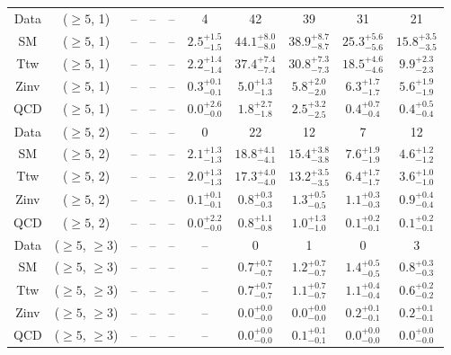 \begin{table}[h!]
{\begin{tabular}{cccccccccc}
	Data & ($\ge5$, 1) & -- & -- & -- & 4 & 42 & 39 & 31 & 21 \\[0.5ex] 
	SM & ($\ge5$, 1) & -- & -- & -- & $2.5^{+ 1.5 }_{- 1.5 }$ & $44.1^{+ 8.0 }_{- 8.0 }$ & $38.9^{+ 8.7 }_{- 8.7 }$ & $25.3^{+ 5.6 }_{- 5.6 }$ & $15.8^{+ 3.5 }_{- 3.5 }$ \\[0.5ex] 
	Ttw & ($\ge5$, 1) & -- & -- & -- & $2.2^{+ 1.4 }_{- 1.4 }$ & $37.4^{+ 7.4 }_{- 7.4 }$ & $30.8^{+ 7.3 }_{- 7.3 }$ & $18.5^{+ 4.6 }_{- 4.6 }$ & $9.9^{+ 2.3 }_{- 2.3 }$ \\[0.5ex] 
	Zinv & ($\ge5$, 1) & -- & -- & -- & $0.3^{+ 0.1 }_{- 0.1 }$ & $5.0^{+ 1.3 }_{- 1.3 }$ & $5.8^{+ 2.0 }_{- 2.0 }$ & $6.3^{+ 1.7 }_{- 1.7 }$ & $5.6^{+ 1.9 }_{- 1.9 }$ \\[0.5ex] 
	QCD & ($\ge5$, 1) & -- & -- & -- & $0.0^{+ 2.6 }_{- 0.0 }$ & $1.8^{+ 2.7 }_{- 1.8 }$ & $2.5^{+ 3.2 }_{- 2.5 }$ & $0.4^{+ 0.7 }_{- 0.4 }$ & $0.4^{+ 0.5 }_{- 0.4 }$ \\[0.5ex] 
	Data & ($\ge5$, 2) & -- & -- & -- & 0 & 22 & 12 & 7 & 12 \\[0.5ex] 
	SM & ($\ge5$, 2) & -- & -- & -- & $2.1^{+ 1.3 }_{- 1.3 }$ & $18.8^{+ 4.1 }_{- 4.1 }$ & $15.4^{+ 3.8 }_{- 3.8 }$ & $7.6^{+ 1.9 }_{- 1.9 }$ & $4.6^{+ 1.2 }_{- 1.2 }$ \\[0.5ex] 
	Ttw & ($\ge5$, 2) & -- & -- & -- & $2.0^{+ 1.3 }_{- 1.3 }$ & $17.3^{+ 4.0 }_{- 4.0 }$ & $13.2^{+ 3.5 }_{- 3.5 }$ & $6.4^{+ 1.7 }_{- 1.7 }$ & $3.6^{+ 1.0 }_{- 1.0 }$ \\[0.5ex] 
	Zinv & ($\ge5$, 2) & -- & -- & -- & $0.1^{+ 0.1 }_{- 0.1 }$ & $0.8^{+ 0.3 }_{- 0.3 }$ & $1.3^{+ 0.5 }_{- 0.5 }$ & $1.1^{+ 0.3 }_{- 0.3 }$ & $0.9^{+ 0.4 }_{- 0.4 }$ \\[0.5ex] 
	QCD & ($\ge5$, 2) & -- & -- & -- & $0.0^{+ 2.2 }_{- 0.0 }$ & $0.8^{+ 1.1 }_{- 0.8 }$ & $1.0^{+ 1.3 }_{- 1.0 }$ & $0.1^{+ 0.2 }_{- 0.1 }$ & $0.1^{+ 0.2 }_{- 0.1 }$ \\[0.5ex] 
	Data & ($\ge5$, $\ge3$) & -- & -- & -- & -- & 0 & 1 & 0 & 3 \\[0.5ex] 
	SM & ($\ge5$, $\ge3$) & -- & -- & -- & -- & $0.7^{+ 0.7 }_{- 0.7 }$ & $1.2^{+ 0.7 }_{- 0.7 }$ & $1.4^{+ 0.5 }_{- 0.5 }$ & $0.8^{+ 0.3 }_{- 0.3 }$ \\[0.5ex] 
	Ttw & ($\ge5$, $\ge3$) & -- & -- & -- & -- & $0.7^{+ 0.7 }_{- 0.7 }$ & $1.1^{+ 0.7 }_{- 0.7 }$ & $1.1^{+ 0.4 }_{- 0.4 }$ & $0.6^{+ 0.2 }_{- 0.2 }$ \\[0.5ex] 
	Zinv & ($\ge5$, $\ge3$) & -- & -- & -- & -- & $0.0^{+ 0.0 }_{- 0.0 }$ & $0.0^{+ 0.0 }_{- 0.0 }$ & $0.2^{+ 0.1 }_{- 0.1 }$ & $0.2^{+ 0.1 }_{- 0.1 }$ \\[0.5ex] 
	QCD & ($\ge5$, $\ge3$) & -- & -- & -- & -- & $0.0^{+ 0.0 }_{- 0.0 }$ & $0.1^{+ 0.1 }_{- 0.1 }$ & $0.0^{+ 0.0 }_{- 0.0 }$ & $0.0^{+ 0.0 }_{- 0.0 }$ \\[0.5ex] 
	\hline
	\hline
\end{tabular}}
\end{table}
